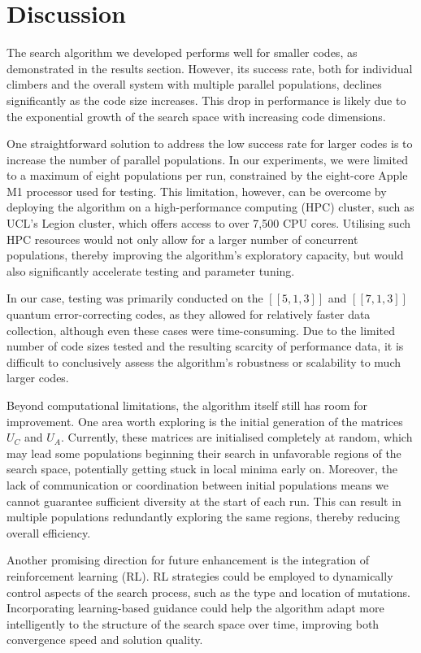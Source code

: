 \chapter{Discussion} \label{Chap5}
The search algorithm we developed performs well for smaller codes, as demonstrated in the results section. However, its success rate, both for individual climbers and the overall system with multiple parallel populations, declines significantly as the code size increases. This drop in performance is likely due to the exponential growth of the search space with increasing code dimensions.

One straightforward solution to address the low success rate for larger codes is to increase the number of parallel populations. In our experiments, we were limited to a maximum of eight populations per run, constrained by the eight-core Apple M1 processor used for testing. This limitation, however, can be overcome by deploying the algorithm on a high-performance computing (HPC) cluster, such as UCL's Legion cluster, which offers access to over 7,500 CPU cores. Utilising such HPC resources would not only allow for a larger number of concurrent populations, thereby improving the algorithm's exploratory capacity, but would also significantly accelerate testing and parameter tuning.

In our case, testing was primarily conducted on the \([[5,1,3]]\) and \([[7,1,3]]\) quantum error-correcting codes, as they allowed for relatively faster data collection, although even these cases were time-consuming. Due to the limited number of code sizes tested and the resulting scarcity of performance data, it is difficult to conclusively assess the algorithm's robustness or scalability to much larger codes.

Beyond computational limitations, the algorithm itself still has room for improvement. One area worth exploring is the initial generation of the matrices \(U_C\) and \(U_A\). Currently, these matrices are initialised completely at random, which may lead some populations beginning their search in unfavorable regions of the search space, potentially getting stuck in local minima early on. Moreover, the lack of communication or coordination between initial populations means we cannot guarantee sufficient diversity at the start of each run. This can result in multiple populations redundantly exploring the same regions, thereby reducing overall efficiency.

Another promising direction for future enhancement is the integration of reinforcement learning (RL). RL strategies could be employed to dynamically control aspects of the search process, such as the type and location of mutations. Incorporating learning-based guidance could help the algorithm adapt more intelligently to the structure of the search space over time, improving both convergence speed and solution quality.

